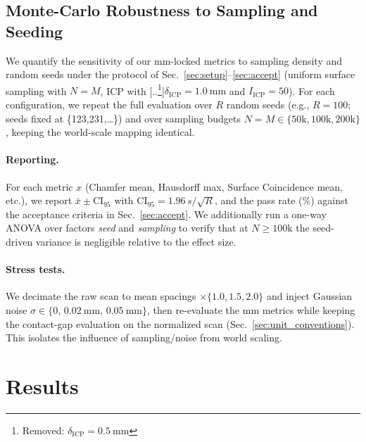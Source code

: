\documentclass{ieeeaccess}
\providecommand{\DIFaddtex}[1]{{\color{blue}\bfseries #1}} %
\providecommand{\DIFdeltex}[1]{{\color{red}[..\footnote{\color{black}Removed: #1}]}} %
\providecommand{\DIFaddbegin}{} %
\providecommand{\DIFaddend}{} %
\providecommand{\DIFdelbegin}{} %
\providecommand{\DIFdelend}{} %
\providecommand{\DIFadd}[1]{\texorpdfstring{\DIFaddtex{#1}}{#1}} %
\providecommand{\DIFdel}[1]{\texorpdfstring{\DIFdeltex{#1}}{}} %
\begin{document}
\DIFaddend \subsection{Monte-Carlo Robustness to Sampling and Seeding}
\label{sec:robustness}
We quantify the sensitivity of our mm-locked metrics to sampling density and random seeds
under the protocol of Sec.~\ref{sec:setup}--\ref{sec:accept} (uniform surface sampling with $N{=}M$,
ICP with \DIFdelbegin \DIFdel{$\delta_{\mathrm{ICP}}{=}\SI{0.5}{\milli\meter}$ }\DIFdelend \DIFaddbegin \DIFadd{$\delta_{\mathrm{ICP}}{=}\SI{1.0}{\milli\meter}$ }\DIFaddend and $I_{\mathrm{ICP}}{=}50$). %
For each configuration, we repeat the full evaluation over $R$ random seeds 
(e.g., $R{=}100$; seeds fixed at \{123,231,\dots\}) and over sampling budgets 
$N{=}M \in \{50\mathrm{k}, 100\mathrm{k}, 200\mathrm{k}\}$, keeping the world-scale mapping identical.

\paragraph*{Reporting.}
For each metric $x$ (Chamfer mean, Hausdorff max, Surface Coincidence mean, etc.), 
we report $\bar x \pm \mathrm{CI}_{95}$ with 
$\mathrm{CI}_{95} = 1.96\, s / \sqrt{R}$, and the pass rate (\%) against the acceptance criteria 
in Sec.~\ref{sec:accept}. We additionally run a one-way ANOVA over factors 
\textit{seed} and \textit{sampling} to verify that at $N{\ge}100\mathrm{k}$ the seed-driven variance 
is negligible relative to the effect size.

\paragraph*{Stress tests.}
We decimate the raw scan to mean spacings $\times\{1.0, 1.5, 2.0\}$ and inject 
Gaussian noise $\sigma \in \{0,\,\SI{0.02}{\milli\meter},\,\SI{0.05}{\milli\meter}\}$, 
then re-evaluate the mm metrics while keeping the contact-gap evaluation on the normalized scan 
(Sec.~\ref{sec:unit_conventions}). This isolates the influence of sampling/noise from world scaling.

\section{Results}
\label{sec:results}
\end{document}
